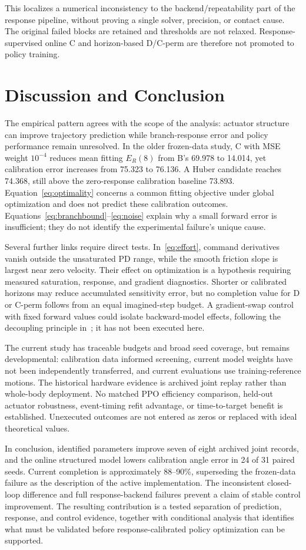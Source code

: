 This localizes a numerical inconsistency to the backend/repeatability part of the response pipeline, without proving a single solver, precision, or contact cause. The original failed blocks are retained and thresholds are not relaxed. Response-supervised online C and horizon-based D/C-perm are therefore not promoted to policy training.

\section{Discussion and Conclusion}
The empirical pattern agrees with the scope of the analysis: actuator structure can improve trajectory prediction while branch-response error and policy performance remain unresolved. In the older frozen-data study, C with MSE weight $10^{-4}$ reduces mean fitting $E_R(8)$ from B's 69.978 to 14.014, yet calibration error increases from 75.323 to 76.136. A Huber candidate reaches 74.368, still above the zero-response calibration baseline 73.893. Equation~\eqref{eq:optimality} concerns a common fitting objective under global optimization and does not predict these calibration outcomes. Equations~\eqref{eq:branchbound}--\eqref{eq:noise} explain why a small forward error is insufficient; they do not identify the experimental failure's unique cause.

Several further links require direct tests. In~\eqref{eq:effort}, command derivatives vanish outside the unsaturated PD range, while the smooth friction slope is largest near zero velocity. Their effect on optimization is a hypothesis requiring measured saturation, response, and gradient diagnostics. Shorter or calibrated horizons may reduce accumulated sensitivity error, but no completion value for D or C-perm follows from an equal imagined-step budget. A gradient-swap control with fixed forward values could isolate backward-model effects, following the decoupling principle in~\cite{dmo}; it has not been executed here.

The current study has traceable budgets and broad seed coverage, but remains developmental: calibration data informed screening, current model weights have not been independently transferred, and current evaluations use training-reference motions. The historical hardware evidence is archived joint replay rather than whole-body deployment. No matched PPO efficiency comparison, held-out actuator robustness, event-timing refit advantage, or time-to-target benefit is established. Unexecuted outcomes are not entered as zeros or replaced with ideal theoretical values.

In conclusion, identified parameters improve seven of eight archived joint records, and the online structured model lowers calibration angle error in 24 of 31 paired seeds. Current completion is approximately 88--90\%, superseding the frozen-data failure as the description of the active implementation. The inconsistent closed-loop difference and full response-backend failures prevent a claim of stable control improvement. The resulting contribution is a tested separation of prediction, response, and control evidence, together with conditional analysis that identifies what must be validated before response-calibrated policy optimization can be supported.
